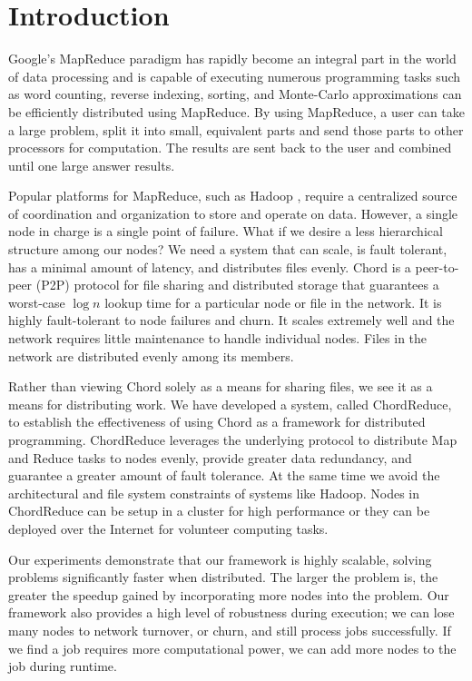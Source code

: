 \documentclass[conference, compsocconf, letterpaper]{IEEEtran}
\begin{document}
\section{Introduction}
Google's MapReduce \cite{mapreduce} paradigm has rapidly become an integral part in the world of data processing and is capable of executing numerous programming tasks such as word counting, reverse indexing, sorting, and Monte-Carlo approximations can be efficiently distributed using MapReduce.  By using MapReduce, a user can take a large problem, split it into small, equivalent parts and send those parts to other processors for computation.  The results are sent back to the user and combined until one large answer results.  

Popular platforms for MapReduce, such as Hadoop \cite{Hadoop}, require a centralized source of coordination and organization to store and operate on data.  However, a single node in charge is a single point of failure.  What if we desire a less hierarchical structure among our nodes?  We need a system that can scale, is fault tolerant, has a minimal amount of latency, and distributes files evenly.  Chord \cite{Chord} is a peer-to-peer (P2P) protocol for file sharing and distributed storage that guarantees a worst-case $\log n$ lookup time for a particular node or file in the network. It is highly fault-tolerant to node failures and churn.  It scales extremely well and the network requires little maintenance to handle individual nodes.  Files in the network are distributed evenly among its members.

Rather than viewing Chord solely as a means for sharing files, we see it as a means for distributing work.  We have developed a system, called ChordReduce, to establish the effectiveness of using Chord as a framework for distributed programming.  ChordReduce leverages the underlying protocol to distribute Map and Reduce tasks to nodes evenly, provide greater data redundancy, and guarantee a greater amount of fault tolerance.   At the same time we avoid the architectural and file system constraints of systems like Hadoop.  Nodes in ChordReduce can be setup in a cluster for high performance or they can be deployed over the Internet for volunteer computing tasks. 

Our experiments demonstrate that our framework is highly scalable, solving problems significantly faster when distributed.  The larger the problem is, the greater the speedup gained by incorporating more nodes into the problem.  Our framework also provides a high level of robustness during execution;  we can lose many nodes to network turnover, or churn, and still process jobs successfully.  If we find a job requires more computational power, we can add more nodes to the job during runtime.
\end{document}
